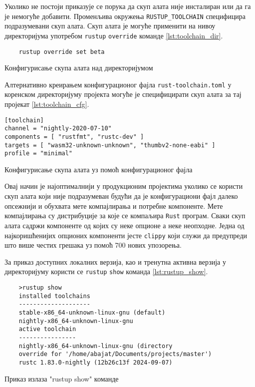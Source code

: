 Уколико не постоји приказује се порука да скуп 
алата није инсталиран или да га је немогуће добавити. Променљива окружења \verb|RUSTUP_TOOLCHAIN| специфицира 
подразумевани скуп алата. Скуп алата је могуће применити на нивоу директоријума употребом \verb|rustup| \verb|override|
команде \ref{lst:toolchain_dir}. 

\begin{listing}[H]
\begin{verbatim}
    rustup override set beta 
\end{verbatim}
\caption{Конфигурисање скупа алата над директоријумом}
\label{lst:toolchain_dir}
\end{listing}

Алтернативно креирањем конфигурационог фајла \verb|rust-toolchain.toml| у коренском 
директоријуму пројекта могуће је специфицирати скуп алата за тај пројекат \ref{lst:toolchain_cfg}.

\begin{listing}[H]
\begin{verbatim}
[toolchain]
channel = "nightly-2020-07-10"
components = [ "rustfmt", "rustc-dev" ]
targets = [ "wasm32-unknown-unknown", "thumbv2-none-eabi" ]
profile = "minimal"
\end{verbatim}
\caption{Конфигурисање скупа алата уз помоћ конфигурационог фајла}
\label{lst:toolchain_cfg}
\end{listing}

Овај начин је најоптималнији у продукционим пројектима уколико се користи скуп алата који 
није подразумеван будући да је конфигурациони фајл далеко опсежнији и обухвата мете компајлирања и 
потребне компоненте. Мете компајлирања су дистрибуције за које се компаљира \verb|Rust| програм.
Сваки скуп алата садржи компоненте од којих су неке опционе а неке неопходне. Једна од најкоришћенијих 
опционих компоненти јесте \verb|clippy| који служи да предупреди што више честих грешака уз помоћ 
700 нових упозорења. 


За приказ доступних локалних верзија, као и тренутна активна верзија у директоријуму користи се \verb|rustup|
\verb|show| команда \ref{lst:rustup_show}.

\begin{listing}[H]
\begin{verbatim}
    >rustup show
    installed toolchains
    --------------------
    stable-x86_64-unknown-linux-gnu (default)
    nightly-x86_64-unknown-linux-gnu
    active toolchain
    ----------------
    nightly-x86_64-unknown-linux-gnu (directory 
    override for '/home/abajat/Documents/projects/master')
    rustc 1.83.0-nightly (12b26c13f 2024-09-07)
\end{verbatim}
\caption{Приказ излаза "rustup show" команде}
\label{lst:rustup_show}
\end{listing}

